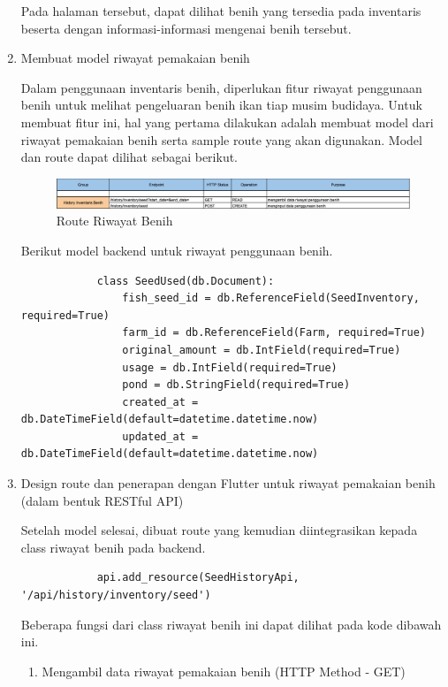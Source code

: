 \begin{spacing}{1.5}
\begin{enumerate}
		Pada halaman tersebut, dapat dilihat benih yang tersedia pada inventaris beserta dengan informasi-informasi mengenai benih tersebut.

		\item Membuat model riwayat pemakaian benih
		
		Dalam penggunaan inventaris benih, diperlukan fitur riwayat penggunaan benih untuk melihat pengeluaran benih ikan tiap musim budidaya. Untuk membuat fitur ini, hal yang pertama dilakukan adalah membuat model dari riwayat pemakaian benih serta sample route yang akan digunakan. Model dan route dapat dilihat sebagai berikut.

		\begin{figure}[H]
			\centering
			\includegraphics[width=1\textwidth]{gambar/sprint3/history_benih_route.png}
			\caption{Route Riwayat Benih}
		\end{figure}

		Berikut model backend untuk riwayat penggunaan benih.

		\begin{lstlisting}
			class SeedUsed(db.Document):
				fish_seed_id = db.ReferenceField(SeedInventory, required=True)
				farm_id = db.ReferenceField(Farm, required=True)
				original_amount = db.IntField(required=True)
				usage = db.IntField(required=True)
				pond = db.StringField(required=True)
				created_at = db.DateTimeField(default=datetime.datetime.now)
				updated_at = db.DateTimeField(default=datetime.datetime.now)
		\end{lstlisting}

		\item Design route dan penerapan dengan Flutter untuk riwayat pemakaian benih (dalam bentuk RESTful API)
		
		Setelah model selesai, dibuat route yang kemudian diintegrasikan kepada class riwayat benih pada backend.

		\begin{lstlisting}
			api.add_resource(SeedHistoryApi, '/api/history/inventory/seed')
		\end{lstlisting}

		Beberapa fungsi dari class riwayat benih ini dapat dilihat pada kode dibawah ini.

		\begin{enumerate}
			\item Mengambil data riwayat pemakaian benih (HTTP Method - GET) 
			

\end{enumerate}
\end{enumerate}
\end{spacing}
